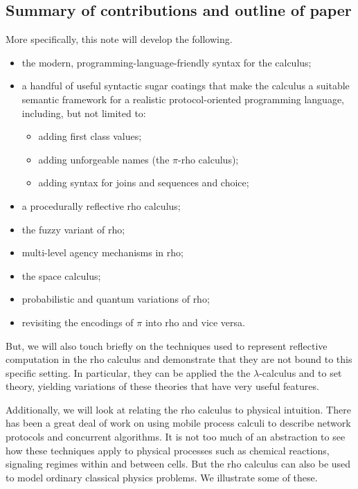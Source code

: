 \subsection{Summary of contributions and outline of paper}
More specifically, this note will develop the following.
\begin{itemize}
  \item the modern, programming-language-friendly syntax for the calculus;
  \item a handful of useful syntactic sugar coatings that make the
    calculus a suitable semantic framework for a realistic
    protocol-oriented programming language, including, but not limited
    to:
    \begin{itemize}
      \item adding first class values;
      \item adding unforgeable names (the $\pi$-rho calculus);
      \item adding syntax for joins and sequences and choice;
    \end{itemize}
  \item a procedurally reflective rho calculus;
  \item the fuzzy variant of rho;
  \item multi-level agency mechanisms in rho;
  \item the space calculus;
  \item probabilistic and quantum variations of rho;
  \item revisiting the encodings of $\pi$ into rho and vice versa.
\end{itemize}

But, we will also touch briefly on the techniques used to represent
reflective computation in the rho calculus and demonstrate that they
are not bound to this specific setting. In particular, they can be
applied the the $\lambda$-calculus and to set theory, yielding
variations of these theories that have very useful features.

Additionally, we will look at relating the rho calculus to physical
intuition. There has been a great deal of work on using mobile process
calculi to describe network protocols and concurrent algorithms. It is
not too much of an abstraction to see how these techniques apply to
physical processes such as chemical reactions, signaling regimes
within and between cells. But the rho calculus can also be used to
model ordinary classical physics problems. We illustrate some of
these.


